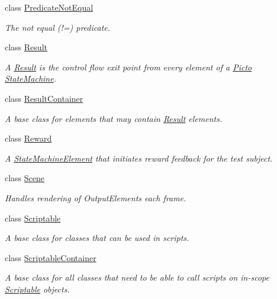 \begin{DoxyCompactItemize}
class \hyperlink{class_picto_1_1_predicate_not_equal}{Predicate\-Not\-Equal}
\begin{DoxyCompactList}\small\item\em The not equal (!=) predicate. \end{DoxyCompactList}\item 
class \hyperlink{class_picto_1_1_result}{Result}
\begin{DoxyCompactList}\small\item\em A \hyperlink{class_picto_1_1_result}{Result} is the control flow exit point from every element of a \hyperlink{namespace_picto}{Picto} \hyperlink{class_picto_1_1_state_machine}{State\-Machine}. \end{DoxyCompactList}\item 
class \hyperlink{class_picto_1_1_result_container}{Result\-Container}
\begin{DoxyCompactList}\small\item\em A base class for elements that may contain \hyperlink{class_picto_1_1_result}{Result} elements. \end{DoxyCompactList}\item 
class \hyperlink{class_picto_1_1_reward}{Reward}
\begin{DoxyCompactList}\small\item\em A \hyperlink{class_picto_1_1_state_machine_element}{State\-Machine\-Element} that initiates reward feedback for the test subject. \end{DoxyCompactList}\item 
class \hyperlink{class_picto_1_1_scene}{Scene}
\begin{DoxyCompactList}\small\item\em Handles rendering of Output\-Elements each frame. \end{DoxyCompactList}\item 
class \hyperlink{class_picto_1_1_scriptable}{Scriptable}
\begin{DoxyCompactList}\small\item\em A base class for classes that can be used in scripts. \end{DoxyCompactList}\item 
class \hyperlink{class_picto_1_1_scriptable_container}{Scriptable\-Container}
\begin{DoxyCompactList}\small\item\em A base class for all classes that need to be able to call scripts on in-\/scope \hyperlink{class_picto_1_1_scriptable}{Scriptable} objects. \end{DoxyCompactList}\item 

\end{DoxyCompactItemize}
